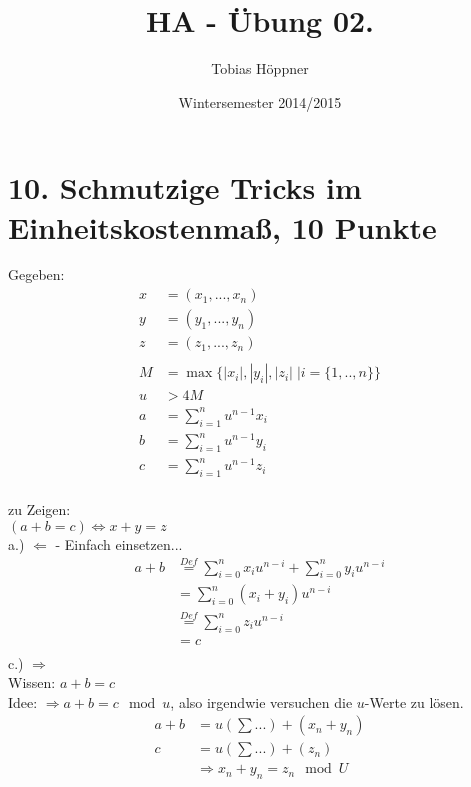 \documentclass[ngerman,a4paper]{report}
\author{Tobias Höppner}
\title{HA - Übung 02. }
\date{Wintersemester 2014/2015}
\renewcommand{\maketitle}{}
\begin{document}
 
\maketitle 
\section*{10.  Schmutzige Tricks im Einheitskostenmaß,  10 Punkte}
Gegeben:
\begin{align*}
x &= (x_1,...,x_n)\\
y &= (y_1,...,y_n)\\
z &= (z_1,...,z_n)\\
\\
M &=\max \{|x_i|,|y_i|,|z_i| \; |i=\{1,..,n\}\}\\
u &> 4M\\
a &=\sum\limits_{i=1}^n u^{n-1} x_i\\
b &=\sum\limits_{i=1}^n u^{n-1} y_i\\
c &=\sum\limits_{i=1}^n u^{n-1} z_i\\
\end{align*}

zu Zeigen:\\
$(a+b=c) \Leftrightarrow x+y=z$\\

a.) $\Leftarrow$ - Einfach einsetzen...\\
\begin{align*}
a+b &\overset{Def}{=} \sum\limits_{i=0}^n x_i u^{n-i} + \sum\limits_{i=0}^n y_i u^{n-i}\\
&= \sum\limits_{i=0}^n (x_i+y_i) u^{n-i} \\
&\overset{Def}{=} \sum\limits_{i=0}^n z_i u^{n-i} \\
&= c\\
\end{align*}
c.) $\Rightarrow$\\
Wissen: $a + b = c$\\
Idee: $\Rightarrow a+b = c \mod u$, also irgendwie versuchen die $u$-Werte zu lösen.\\
\begin{align*}
a + b &= u (\sum ...) + (x_n + y_n)\\
c &= u (\sum ...) + (z_n)\\
&\Rightarrow x_n+y_n = z_n \mod U
\end{align*}
\end{document}
